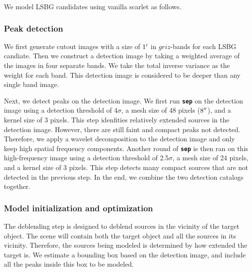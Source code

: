 \documentclass[twocolumn,astrosymb,twocolappendix]{aastex631}
\newcommand{\code}[1]{\textbf{\texttt{#1}}}
\begin{document}
\begin{CJK*}{UTF8}{gbsn}
We model LSBG candidates using vanilla scarlet as follows. 

\subsubsection{Peak detection}
We first generate cutout images with a size of $1\mbox{$^\prime$}$ in $griz$-bands for each LSBG candiate. Then we construct a detection image by taking a weighted average of the images in four separate bands. We take the total inverse variance as the weight for each band. This detection image is considered to be deeper than any single band image. 

Next, we detect peaks on the detection image. We first run \code{sep} on the detection image using a detection threshold of 4$\sigma$, a mesh size of 48 pixels ($8\mbox{$^{\prime\prime}$}$), and a kernel size of 3 pixels. This step idenfities relatively extended sources in the detection image. However, there are still faint and compact peaks not detected. Therefore, we apply a wavelet decomposition to the detection image \citep{Starck2015} and only keep high spatial frequency components. Another round of \code{sep} is then ran on this high-frequency image using a detection threshold of 2.5$\sigma$, a mesh size of 24 pixels, and a kernel size of 3 pixels. This step detects many compact sources that are not detected in the previous step. In the end, we combine the two detection catalogs together. 

\subsubsection{Model initialization and optimization}
The deblending step is designed to deblend sources in the vicinity of the target object. The scene will contain both the target object and all the sources in its vicinity. Therefore, the sources being modeled is determined by how extended the target is. We estimate a bounding box based on the detection image, and include all the peaks inside this box to be modeled.


\end{CJK*}
\end{document}
